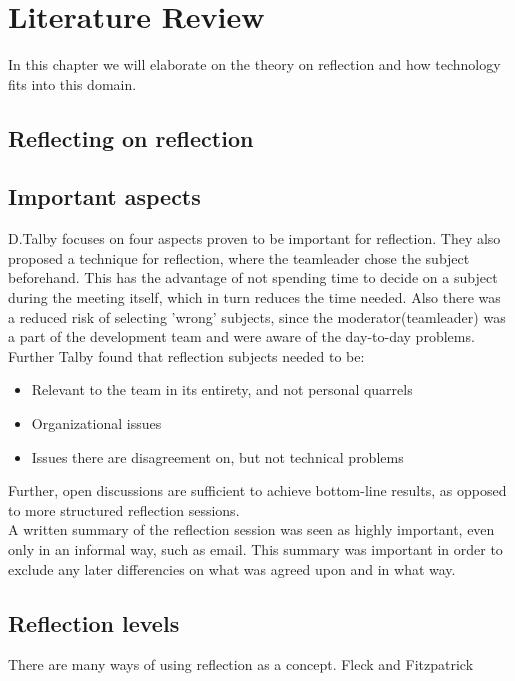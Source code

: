 \section{Literature Review}
In this chapter we will elaborate on the theory on reflection and how technology fits into this domain. 

\subsection{Reflecting on reflection}
\subsection*{Important aspects}
D.Talby \cite{Talby2006} focuses on four aspects proven to be important for reflection. They also proposed a technique for reflection, where the teamleader chose the subject beforehand. This has the advantage of not spending time to decide on a subject during the meeting itself, which in turn reduces the time needed. Also there was a reduced risk of selecting 'wrong' subjects, since the moderator(teamleader) was a part of the development team and were aware of the day-to-day problems.\\
Further Talby found that reflection subjects needed to be:
\begin{itemize}
\item Relevant to the team in its entirety, and not personal quarrels
\item Organizational issues
\item Issues there are disagreement on, but not technical problems
\end{itemize}
Further, open discussions are sufficient to achieve bottom-line results, as opposed to more structured reflection sessions.\\
A written summary of the reflection session was seen as highly important, even only in an informal way, such as email. This summary was important in order to exclude any later differencies on what was agreed upon and in what way.
\subsection*{Reflection levels}
There are many ways of using reflection as a concept. Fleck and Fitzpatrick 


